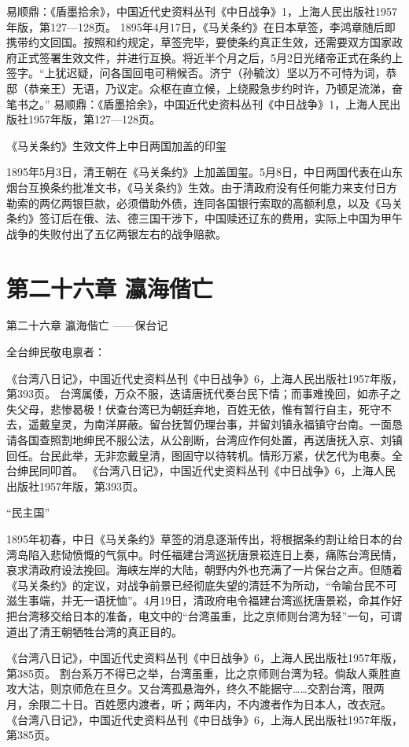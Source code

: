 \documentclass[12pt,UTF8]{ctexbook}
\begin{document}
易顺鼎：《盾墨拾余》，中国近代史资料丛刊《中日战争》1，上海人民出版社1957年版，第127—128页。
1895年4月17日，《马关条约》在日本草签，李鸿章随后即携带约文回国。按照和约规定，草签完毕，要使条约真正生效，还需要双方国家政府正式签署生效文件，并进行互换。将近半个月之后，5月2日光绪帝正式在条约上签字。“上犹迟疑，问各国回电可稍候否。济宁（孙毓汶）坚以万不可恃为词，恭邸（恭亲王）无语，乃议定。众枢在直立候，上绕殿急步约时许，乃顿足流涕，奋笔书之。” 易顺鼎：《盾墨拾余》，中国近代史资料丛刊《中日战争》1，上海人民出版社1957年版，第127—128页。


《马关条约》生效文件上中日两国加盖的印玺

1895年5月3日，清王朝在《马关条约》上加盖国玺。5月8日，中日两国代表在山东烟台互换条约批准文书，《马关条约》生效。由于清政府没有任何能力来支付日方勒索的两亿两银巨款，必须借助外债，连同各国银行索取的高额利息，以及《马关条约》签订后在俄、法、德三国干涉下，中国赎还辽东的费用，实际上中国为甲午战争的失败付出了五亿两银左右的战争赔款。

\chapter{第二十六章 瀛海偕亡}

第二十六章
瀛海偕亡
——保台记

全台绅民敬电禀者：

《台湾八日记》，中国近代史资料丛刊《中日战争》6，上海人民出版社1957年版，第393页。
台湾属倭，万众不服，迭请唐抚代奏台民下情；而事难挽回，如赤子之失父母，悲惨曷极！伏查台湾已为朝廷弃地，百姓无依，惟有暂行自主，死守不去，遥戴皇灵，为南洋屏蔽。留台抚暂仍理台事，并留刘镇永福镇守台南。一面恳请各国查照割地绅民不服公法，从公剖断，台湾应作何处置，再送唐抚入京、刘镇回任。台民此举，无非恋戴皇清，图固守以待转机。情形万紧，伏乞代为电奏。全台绅民同叩首。 《台湾八日记》，中国近代史资料丛刊《中日战争》6，上海人民出版社1957年版，第393页。

“民主国”

1895年初春，中日《马关条约》草签的消息逐渐传出，将根据条约割让给日本的台湾岛陷入悲恸愤慨的气氛中。时任福建台湾巡抚唐景崧连日上奏，痛陈台湾民情，哀求清政府设法挽回。海峡左岸的大陆，朝野内外也充满了一片保台之声。但随着《马关条约》的定议，对战争前景已经彻底失望的清廷不为所动，“令喻台民不可滋生事端，并无一语抚恤”。4月19日，清政府电令福建台湾巡抚唐景崧，命其作好把台湾移交给日本的准备，电文中的“台湾虽重，比之京师则台湾为轻”一句，可谓道出了清王朝牺牲台湾的真正目的。

《台湾八日记》，中国近代史资料丛刊《中日战争》6，上海人民出版社1957年版，第385页。
割台系万不得已之举，台湾虽重，比之京师则台湾为轻。倘敌人乘胜直攻大沽，则京师危在旦夕。又台湾孤悬海外，终久不能据守……交割台湾，限两月，余限二十日。百姓愿内渡者，听；两年内，不内渡者作为日本人，改衣冠。 《台湾八日记》，中国近代史资料丛刊《中日战争》6，上海人民出版社1957年版，第385页。
\end{document}

